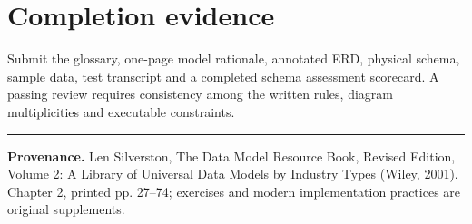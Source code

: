 \documentclass[11pt,letterpaper]{article}
\begin{document}
\section{Completion evidence}
Submit the glossary, one-page model rationale, annotated ERD, physical schema, sample data, test transcript and a completed schema assessment scorecard. A passing review requires consistency among the written rules, diagram multiplicities and executable constraints.


\vfill
\hrule
{\footnotesize\textbf{Provenance.} Len Silverston, The Data Model Resource Book, Revised Edition, Volume 2: A Library of Universal Data Models by Industry Types (Wiley, 2001). Chapter 2, printed pp. 27--74; exercises and modern implementation practices are original supplements.}
\end{document}
